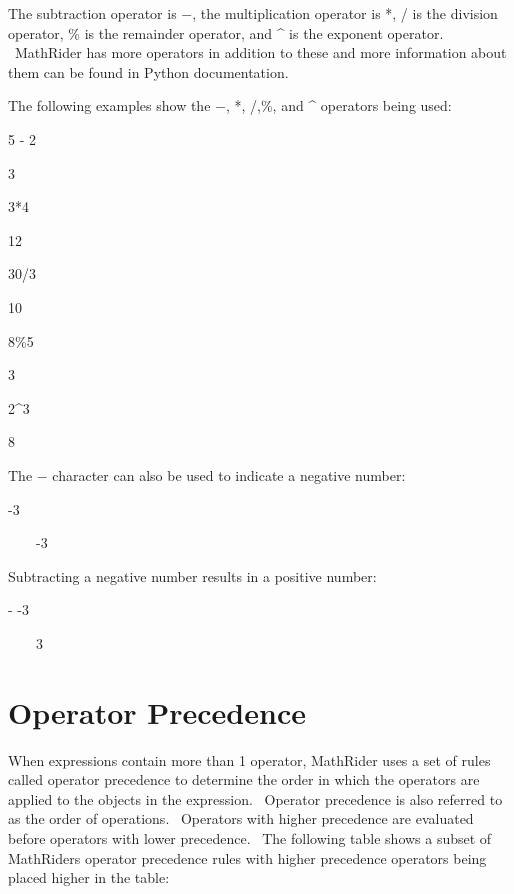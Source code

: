 \documentclass[12pt,twoside]{book}
\begin{document}
The subtraction operator is $-$, the multiplication operator is *, / is
the division operator, \% is the remainder operator, and \^{} is the
exponent operator. \ MathRider has more operators in addition to these
and more information about them can be found in Python documentation.


\bigskip

The following examples show the $-$, *, /,\%, and \^{} operators being
used:


\bigskip

5 {}- 2

{\textbar}

3


\bigskip

3*4

{\textbar}

12


\bigskip

30/3

{\textbar}

10


\bigskip

8\%5

{\textbar}

3


\bigskip

2\^{}3

{\textbar}

8


\bigskip

The $-$ character can also be used to indicate a negative number:


\bigskip

{}-3

{\textbar}

\ \ \ \ {}-3


\bigskip

Subtracting a negative number results in a positive number:


\bigskip

{}- {}-3

{\textbar}

\ \ \ \ 3

\section[Operator Precedence]{Operator Precedence}

When expressions contain more than 1 operator, MathRider uses a set of
rules called operator precedence to determine the order in which the
operators are applied to the objects in the expression. \ Operator
precedence is also referred to as the order of operations. \ Operators
with higher precedence are evaluated before operators with lower
precedence. \ The following table shows a subset of
MathRider{\textquotesingle}s operator precedence rules with higher
precedence operators being placed higher in the table:
\end{document}
